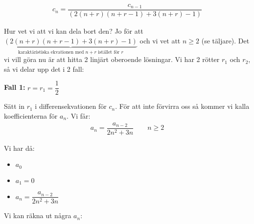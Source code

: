 \begin{equation*}
  \begin{gathered}
    c_n = \dfrac{c_{n-1}}{(2(n+r)(n+r-1)+3(n+r)-1)}
  \end{gathered}
\end{equation*}\par
\noindent Hur vet vi att vi kan dela bort den? Jo för att $\underbrace{(2(n+r)(n+r-1)+3(n+r)-1)}_{\text{karaktäristiska ekvationen med $n+r$ istället för $r$}}$ och vi vet att $n\geq2$ (se täljare). Det vi vill göra nu är att hitta 2 linjärt oberoende lösningar. Vi har 2 rötter $r_1$ och $r_2$, så vi delar upp det i 2 fall:
\par\bigskip
\noindent \textbf{Fall 1:} $r=r_1=\dfrac{1}{2}$
\par\bigskip
\noindent Sätt in $r_1$ i differensekvationen för $c_n$. För att inte förvirra oss så kommer vi kalla koefficienterna för $a_n$. Vi får:
\begin{equation*}
  \begin{gathered}
    a_n=\dfrac{a_{n-2}}{2n^2+3n}\qquad n\geq2
  \end{gathered}
\end{equation*}\par
\noindent Vi har då:
\begin{itemize}
  \item $a_0$
  \item $a_1=0$
  \item $a_n = \dfrac{a_{n-2}}{2n^2+3n}$
\end{itemize}\par
\noindent Vi kan räkna ut några $a_n$:

